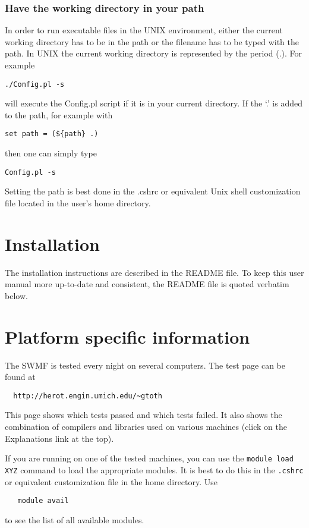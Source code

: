 \subsubsection{Have the working directory in your path}

In order to run executable files in the UNIX environment, either
the current working directory has to be in the path or the filename has
to be typed with the path.
In UNIX the current working directory is represented
by the period (.).  For example
\begin{verbatim} 
./Config.pl -s
\end{verbatim}
will execute the Config.pl script if it is in your current directory.  
If the `.' is added to the path, for example with
\begin{verbatim}
set path = (${path} .)
\end{verbatim}
then one can simply type
\begin{verbatim} 
Config.pl -s
\end{verbatim}
Setting the path is best done in the .cshrc or equivalent Unix shell 
customization file located in the user's home directory.

\section{Installation}

The installation instructions are described in the README file.
To keep this user manual more up-to-date and consistent, 
the README file is quoted verbatim below.



\section{Platform specific information}

The SWMF is tested every night on several computers.
The test page can be found at
\begin{verbatim}
  http://herot.engin.umich.edu/~gtoth
\end{verbatim}
This page shows which tests passed and which tests failed.
It also shows the combination of compilers and libraries
used on various machines (click on the Explanations link at the top).

If you are running on one of the tested machines, 
you can use the {\tt module load XYZ} command to load 
the appropriate modules. It is best to do this in the {\tt .cshrc} or equivalent 
customization file in the home directory. Use
\begin{verbatim}
   module avail
\end{verbatim}
to see the list of all available modules.

